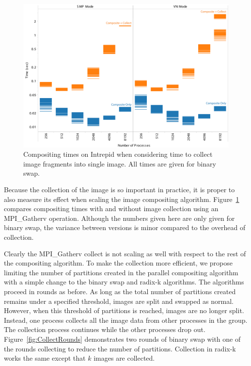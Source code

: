 \documentclass{sig-alternate}
\begin{document}
\begin{figure}[htbp]
  \centering
  \includegraphics[width=\linewidth]{images/PartitionCollectIntrepidFull}
  \caption{Compositing times on Intrepid when considering time to collect
    image fragments into single image.  All times are given for binary
    swap.}
  \label{fig:PartitionCollectFull}
\end{figure}

Because the collection of the image is so important in practice, it is
proper to also measure its effect when scaling the image compositing
algorithm.  Figure~\ref{fig:PartitionCollectFull} compares compositing
times with and without image collection using an MPI\_Gatherv operation.
Although the numbers given here are only given for binary swap, the
variance between versions is minor compared to the overhead of collection.

Clearly the MPI\_Gatherv collect is not scaling as well with respect to the
rest of the compositing algorithm.  To make the collection more efficient,
we propose limiting the number of partitions created in the parallel
compositing algorithm with a simple change to the binary swap and radix-k
algorithms.  The algorithms proceed in rounds as before.  As long as the
total number of partitions created remains under a specified threshold,
images are split and swapped as normal.  However, when this threshold of
partitions is reached, images are no longer split.  Instead, one process
collects all the image data from other processes in the group.  The
collection process continues while the other processes drop out.
Figure~\ref{fig:CollectRounds} demonstrates two rounds of binary swap with
one of the rounds collecting to reduce the number of partitions.
Collection in radix-k works the same except that $k$ images are collected.
\end{document}
